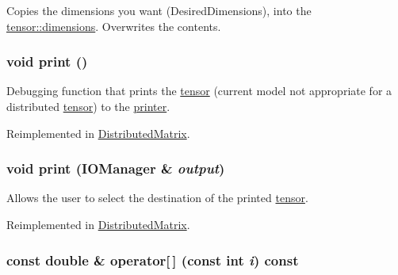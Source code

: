 Copies the dimensions you want (DesiredDimensions), into the \hyperlink{classJKBuilder_1_1tensor_a2ce1e6e0782ddee097f2c4aa2663d3e9}{tensor::dimensions}. Overwrites the contents. \hypertarget{classJKBuilder_1_1tensor_a388f572c62279f839ee138a9afbdeeb5}{
\subsubsection[{print}]{\setlength{\rightskip}{0pt plus 5cm}void print ()}}
\label{classJKBuilder_1_1tensor_a388f572c62279f839ee138a9afbdeeb5}


Debugging function that prints the \hyperlink{classJKBuilder_1_1tensor}{tensor} (current model not appropriate for a distributed \hyperlink{classJKBuilder_1_1tensor}{tensor}) to the \hyperlink{classJKBuilder_1_1printer}{printer}. 

Reimplemented in \hyperlink{classJKBuilder_1_1DistributedMatrix_a388f572c62279f839ee138a9afbdeeb5}{DistributedMatrix}.\hypertarget{classJKBuilder_1_1tensor_a74b2fe351a5444c1325870dc6162f451}{
\subsubsection[{print}]{\setlength{\rightskip}{0pt plus 5cm}void print ({\bf IOManager} \& {\em output})}}
\label{classJKBuilder_1_1tensor_a74b2fe351a5444c1325870dc6162f451}


Allows the user to select the destination of the printed \hyperlink{classJKBuilder_1_1tensor}{tensor}. 

Reimplemented in \hyperlink{classJKBuilder_1_1DistributedMatrix_a74b2fe351a5444c1325870dc6162f451}{DistributedMatrix}.\hypertarget{classJKBuilder_1_1tensor_a4f0dc1b84b580cec49500c70f87e084a}{
\subsubsection[{operator[]}]{\setlength{\rightskip}{0pt plus 5cm}const double \& operator\mbox{[}$\,$\mbox{]} (const int {\em i}) const}}
\label{classJKBuilder_1_1tensor_a4f0dc1b84b580cec49500c70f87e084a}


